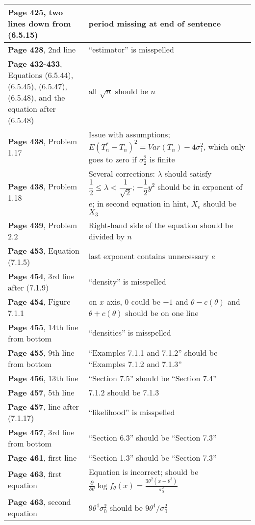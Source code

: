 \documentclass[10pt, a4paper]{article}
\begin{document}
\begin{longtable}{|R{.40\textwidth}|R{.55\textwidth}|}
\textbf{Page 425}, two lines down from (6.5.15) & period missing at end of sentence \\ \hline
\textbf{Page 428}, 2nd line & ``estimator'' is misspelled \\ \hline
\textbf{Page 432-433}, Equations (6.5.44), (6.5.45), (6.5.47), (6.5.48), and the equation after (6.5.48) & all $\sqrt{n}$ should be $n$ \\ \hline
\textbf{Page 438}, Problem 1.17 & Issue with assumptions; $E(T_n^*-T_n)^2=Var(T_n)-4\sigma_1^2$, which only goes to zero if $\sigma_2^2$ is finite \\ \hline
\textbf{Page 438}, Problem 1.18 & Several corrections: $\lambda$ should satisfy $\dfrac{1}{2} \leq \lambda < \dfrac{1}{\sqrt{2}}$; $-\dfrac{1}{2}y^2$ should be in exponent of $e$; in second equation in hint, $X_e$ should be $X_3$ \\ \hline
\textbf{Page 439}, Problem 2.2 & Right-hand side of the equation should be divided by $n$ \\ \hline
\textbf{Page 453}, Equation (7.1.5) & last exponent contains unnecessary $e$ \\ \hline
\textbf{Page 454}, 3rd line after (7.1.9) & ``density'' is misspelled \\ \hline
\textbf{Page 454}, Figure 7.1.1 & on $x$-axis, $0$ could be $-1$ and $\theta-c(\theta)$ and $\theta+c(\theta)$ should be on one line \\ \hline
\textbf{Page 455}, 14th line from bottom & ``densities'' is misspelled \\ \hline
\textbf{Page 455}, 9th line from bottom & ``Examples 7.1.1 and 7.1.2'' should be ``Examples 7.1.2 and 7.1.3'' \\ \hline
\textbf{Page 456}, 13th line & ``Section 7.5'' should be ``Section 7.4'' \\ \hline
\textbf{Page 457}, 5th line & 7.1.2 should be 7.1.3 \\ \hline
\textbf{Page 457}, line after (7.1.17) & ``likelihood'' is misspelled \\ \hline
\textbf{Page 457}, 3rd line from bottom & ``Section 6.3'' should be ``Section 7.3'' \\ \hline
\textbf{Page 461}, first line & ``Section 1.3'' should be ``Section 7.3'' \\ \hline
\textbf{Page 463}, first equation & Equation is incorrect; should be $\frac{\partial}{\partial\theta}\log f_\theta(x) = \frac{3\theta^2(x-\theta^3)}{\sigma_0^2}$ \\ \hline
\textbf{Page 463}, second equation & $9\theta^4\sigma_0^2$ should be $9\theta^4/\sigma_0^2$ \\ \hline

\end{longtable}
\end{document}
